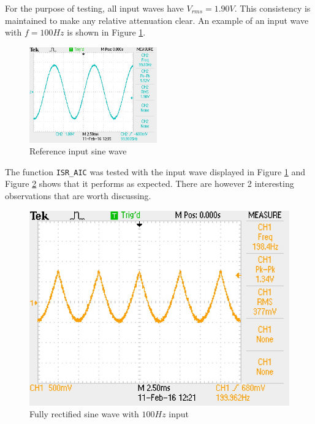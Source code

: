 \documentclass{article}
\begin{document}
For the purpose of testing, all input waves have $V_{rms}=1.90V$. This consistency is maintained to make any relative attenuation clear. An example of an input wave with $f=100Hz$ is shown in Figure \ref{fig:ex1_100Hz_input}.

\begin{figure}[H]
    \centering
    \includegraphics[width=0.49\textwidth]{ex1_100Hz_input}
    \caption{Reference input sine wave}
    \label{fig:ex1_100Hz_input}
\end{figure}

The function {\tt ISR\_AIC} was tested with the input wave displayed in Figure \ref{fig:ex1_100Hz_input} and Figure \ref{fig:ex1_200Hz_output} shows that it performs as expected. There are however 2 interesting observations that are worth discussing.\\ 

\begin{figure}[H]
    \centering
    \includegraphics{ex1_200Hz_output}
    \caption{Fully rectified sine wave with $100Hz$ input}
    \label{fig:ex1_200Hz_output}
\end{figure}
\end{document}

